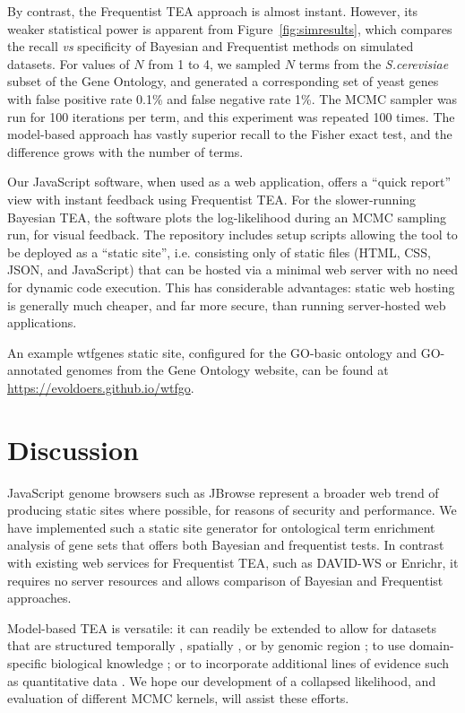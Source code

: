 By contrast, the Frequentist TEA approach is almost instant.
However, its weaker statistical power is apparent from Figure~\ref{fig:simresults},
which compares the recall {\em vs} specificity of Bayesian and Frequentist methods
on simulated datasets. For values of $N$ from 1 to 4, we sampled $N$ terms
from the {\em S.cerevisiae} subset of the Gene Ontology,
and generated a corresponding set of yeast genes with false positive rate 0.1\% and false negative rate 1\%.
The MCMC sampler was run for 100 iterations per term, and this experiment was repeated 100 times.
The model-based approach has vastly superior recall to the Fisher exact test, and the difference
grows with the number of terms.

Our JavaScript software, when used as a web application,
offers a ``quick report'' view with instant feedback using Frequentist TEA.
For the slower-running Bayesian TEA, the software plots the log-likelihood during an MCMC sampling run, for visual feedback.
The repository includes setup scripts allowing the tool to be deployed as a ``static site'',
i.e. consisting only of static files (HTML, CSS, JSON, and JavaScript) that can be hosted via a minimal web server with no need for dynamic code execution.
This has considerable advantages: static web hosting is generally much cheaper, and far more secure, than running server-hosted web applications.

An example wtfgenes static site, configured for the GO-basic ontology and GO-annotated genomes from the Gene Ontology website,
can be found at \url{https://evoldoers.github.io/wtfgo}.

\section*{Discussion}

JavaScript genome browsers such as JBrowse \citep{pmid27072794}
represent a broader web trend of producing static sites where possible, for reasons of security and performance.
We have implemented such a static site generator for ontological term enrichment analysis of gene sets that offers both Bayesian and frequentist tests.
In contrast with existing web services for Frequentist TEA, such as DAVID-WS or Enrichr,
it requires no server resources and allows comparison of Bayesian and Frequentist approaches.

Model-based TEA is versatile: it can readily be extended
to allow for datasets that are structured
temporally \citep{pmid26111374},
spatially \citep{pmid26877824},
or by genomic region \citep{pmid20436461};
to use domain-specific biological knowledge \citep{pmid24675718};
or to incorporate additional lines of evidence such as quantitative data \citep{pmid21599902}.
We hope our development of a collapsed likelihood, and evaluation of different MCMC kernels, will assist these efforts.

